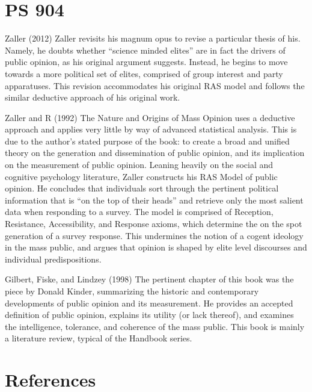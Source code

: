 \documentclass[
  english,
  man]{apa6}
\begin{document}
\hypertarget{ps-904}{%
\section{PS 904}\label{ps-904}}

Zaller (2012)
Zaller revisits his magnum opus to revise a particular thesis of his. Namely,
he doubts whether \enquote{science minded elites} are in fact the drivers of public
opinion, as his original argument suggests. Instead, he begins to move
towards a more political set of elites, comprised of group interest and party
apparatuses. This revision accommodates his original RAS model and follows the
similar deductive approach of his original work.

Zaller and R (1992)
The Nature and Origins of Mass Opinion uses a deductive approach and applies
very little by way of advanced statistical analysis. This is due to the author's
stated purpose of the book: to create a broad and unified theory on the
generation and dissemination of public opinion, and its implication on the
measurement of public opinion. Leaning heavily on the social and cognitive
psychology literature, Zaller constructs his RAS Model of public opinion.
He concludes that individuals sort through the pertinent political information
that is \enquote{on the top of their heads} and retrieve only the most salient data
when responding to a survey. The model is comprised of Reception, Resistance,
Accessibility, and Response axioms, which determine the on the spot generation
of a survey response. This undermines the notion of a cogent ideology in the
mass public, and argues that opinion is shaped by elite level discourses and
individual predispositions.

Gilbert, Fiske, and Lindzey (1998)
The pertinent chapter of this book was the piece by Donald Kinder, summarizing
the historic and contemporary developments of public opinion and its
measurement. He provides an accepted definition of public opinion, explains
its utility (or lack thereof), and examines the intelligence, tolerance, and
coherence of the mass public. This book is mainly a literature review, typical
of the Handbook series.

\newpage

\hypertarget{references}{%
\section{References}\label{references}}

\begingroup
\setlength{\parindent}{-0.5in}
\setlength{\leftskip}{0.5in}
\end{document}
